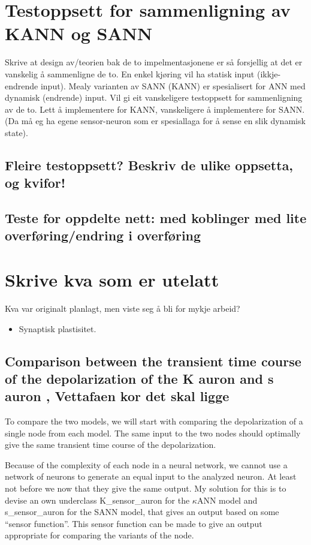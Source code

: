\section{Testoppsett for sammenligning av KANN og SANN}
Skrive at design av/teorien bak  de to impelmentasjonene er så forsjellig at det er vanskelig å sammenligne de to. En enkel kjøring vil ha statisk input (ikkje-endrende input).
Mealy varianten av SANN (KANN) er spesialisert for ANN med dynamisk (endrende) input. Vil gi eit vanskeligere testoppsett for sammenligning av de to. Lett å implementere for KANN, vanskeligere å implementere for SANN.
(Da må eg ha egene sensor-neuron som er spesiallaga for å sense en slik dynamisk state).

	\subsection{Fleire testoppsett? Beskriv de ulike oppsetta, og kvifor!}
	\subsection{Teste for oppdelte nett: med koblinger med lite overføring/endring i overføring}

\section{Skrive kva som er utelatt} %
Kva var originalt planlagt, men viste seg å bli for mykje arbeid?

\begin{itemize}
 	\item Synaptisk plastisitet.
\end{itemize}




\subsection{Comparison between the transient time course of the depolarization of the K auron and s auron ,   Vettafaen kor det skal ligge}
To compare %
			the two models, we will start with comparing the depolarization of a single node from each model.
The same input to the two nodes should optimally give the same transient time course of the depolarization.

Because of the complexity of each node in a neural network, we cannot use a network of neurons to generate an equal input to the analyzed neuron. 
At least not before we now that they give the same output.
My solution for this is 
						to devise an own underclass K\_sensor\_auron for the $\kappa$ANN model and s\_sensor\_auron for the SANN model, that gives an output based on some ``sensor function''.
This sensor function can be made to give an output appropriate for comparing the variants of the node.

